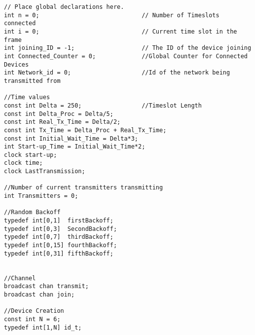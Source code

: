\begin{lstlisting}[style=UPPAAL,
caption={Code for the global declarations in CCUC}]
// Place global declarations here.
int n = 0;                             // Number of Timeslots connected
int i = 0;                             // Current time slot in the frame
int joining_ID = -1;                   // The ID of the device joining       
int Connected_Counter = 0;             //Global Counter for Connected Devices
int Network_id = 0;                    //Id of the network being transmitted from

//Time values
const int Delta = 250;                 //Timeslot Length
const int Delta_Proc = Delta/5;
const int Real_Tx_Time = Delta/2;
const int Tx_Time = Delta_Proc + Real_Tx_Time;
const int Initial_Wait_Time = Delta*3;
int Start-up_Time = Initial_Wait_Time*2;
clock start-up;
clock time;
clock LastTransmission;

//Number of current transmitters transmitting
int Transmitters = 0;

//Random Backoff
typedef int[0,1]  firstBackoff;
typedef int[0,3]  SecondBackoff;
typedef int[0,7]  thirdBackoff;
typedef int[0,15] fourthBackoff;
typedef int[0,31] fifthBackoff;


//Channel
broadcast chan transmit;
broadcast chan join;

//Device Creation
const int N = 6;
typedef int[1,N] id_t;
\end{lstlisting}
